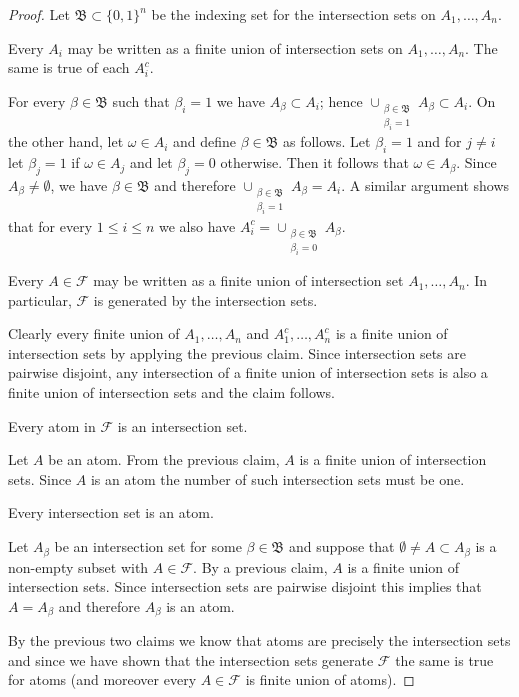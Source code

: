 \begin{proof}
Let $\mathfrak{B} \subset \lbrace 0,1 \rbrace^n$ be the indexing set for the intersection sets on $A_1, \dotsc, A_n$.
\begin{clm} Every $A_i$ may be written as a finite union of intersection sets on $A_1, \dotsc, A_n$.  The same is true of each $A_i^c$.  
\end{clm}
For every $\beta \in \mathfrak{B}$ such that $\beta_i = 1$ we have $A_\beta \subset A_i$; hence $\cup_{\substack{\beta \in \mathfrak{B} \\ \beta_i=1}} A_\beta \subset A_i$.   On the other hand, let $\omega \in A_i$ and define $\beta \in \mathfrak{B}$ as follows.  Let $\beta_i = 1$ and for $j \neq i$ let $\beta_j = 1$ if $\omega \in A_j$ and let $\beta_j =0$ otherwise.  Then it follows that $\omega \in A_\beta$.  Since $A_\beta \neq \emptyset$, we have $\beta \in \mathfrak{B}$ and therefore $\cup_{\substack{\beta \in \mathfrak{B} \\ \beta_i=1}} A_\beta = A_i$.  A similar argument shows that for every $1 \leq i \leq n$ we also have $A_i^c = \cup_{\substack{\beta \in \mathfrak{B}\\ \beta_i = 0}} A_\beta$.  

\begin{clm} Every $A \in \mathcal{F}$ may be written as a finite union of intersection set $A_1, \dotsc, A_n$.  In particular, $\mathcal{F}$ is generated by the intersection sets.
\end{clm}
Clearly every finite union of $A_1, \dotsc, A_n$ and $A^c_1, \dotsc, A^c_n$ is a finite union of intersection sets by applying the previous claim.  Since intersection sets are pairwise disjoint, any intersection of a finite union of intersection sets is also a finite union of intersection sets and the claim follows.

\begin{clm}Every atom in $\mathcal{F}$ is an intersection set.
\end{clm}
Let $A$ be an atom.  From the previous claim, $A$ is a finite union of intersection sets.  Since $A$ is an atom the number of such intersection sets must be one.

\begin{clm}Every intersection set is an atom.
\end{clm}
Let $A_\beta$ be an intersection set for some $\beta \in \mathfrak{B}$ and suppose that $\emptyset \neq A \subset A_\beta$ is a non-empty subset with $A \in \mathcal{F}$.  By a previous claim, $A$ is a finite union of intersection sets.  Since intersection sets are pairwise disjoint this implies that $A = A_\beta$ and therefore $A_\beta$ is an atom.

By the previous two claims we know that atoms are precisely the intersection sets and since we have shown that the intersection sets generate $\mathcal{F}$ the same is true for atoms (and moreover every $A \in \mathcal{F}$ is finite union of atoms).
\end{proof}

